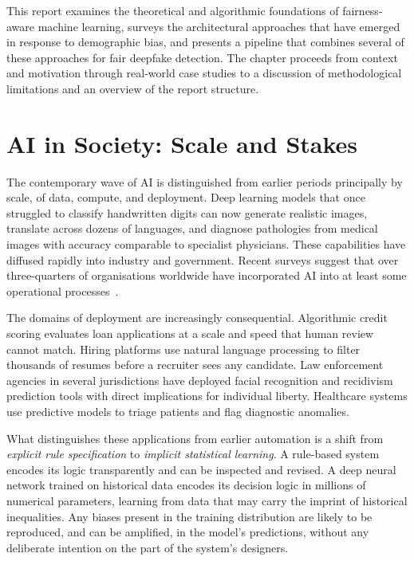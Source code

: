 This report examines the theoretical and algorithmic foundations of
fairness-aware machine learning, surveys the architectural approaches that
have emerged in response to demographic bias, and presents a pipeline that
combines several of these approaches for fair deepfake detection.  The
chapter proceeds from context and motivation through real-world case studies
to a discussion of methodological limitations and an overview of the report
structure.

\section{AI in Society: Scale and Stakes}
\label{sec:ai_growth}

The contemporary wave of AI is distinguished from earlier periods principally
by scale, of data, compute, and deployment.  Deep learning models that once
struggled to classify handwritten digits can now generate realistic images,
translate across dozens of languages, and diagnose pathologies from medical
images with accuracy comparable to specialist physicians.  These capabilities
have diffused rapidly into industry and government.  Recent surveys suggest
that over three-quarters of organisations worldwide have incorporated AI into
at least some operational processes~\cite{mckinsey2024}.

The domains of deployment are increasingly consequential.  Algorithmic credit
scoring evaluates loan applications at a scale and speed that human review
cannot match.  Hiring platforms use natural language processing to filter
thousands of resumes before a recruiter sees any candidate.  Law enforcement
agencies in several jurisdictions have deployed facial recognition and
recidivism prediction tools with direct implications for individual liberty.
Healthcare systems use predictive models to triage patients and flag
diagnostic anomalies.

What distinguishes these applications from earlier automation is a shift from
\emph{explicit rule specification} to \emph{implicit statistical learning}.
A rule-based system encodes its logic transparently and can be inspected
and revised.  A deep neural network trained on historical data encodes its
decision logic in millions of numerical parameters, learning from data that
may carry the imprint of historical inequalities.  Any biases present in the
training distribution are likely to be reproduced, and can be
amplified, in the model's predictions, without any deliberate intention on
the part of the system's designers.

